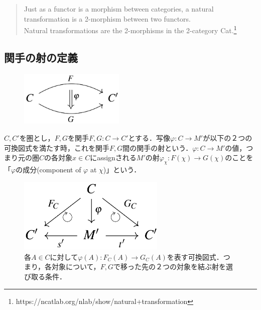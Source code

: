\documentclass[uplatex, 12pt, a4paper, dvipdfmx]{jsarticle}
\begin{document}
\begin{quote}Just as a functor is a morphism between categories, a natural transformation is a 2-morphism between two functors. \\ Natural transformations are the 2-morphisms in the 2-category Cat.\footnote{https://ncatlab.org/nlab/show/natural+transformation}\end{quote}
\subsection{関手の射の定義}
\begin{figure}[ht]\begin{center}\includegraphics[width=5cm]{cd-12.png}\end{center}\end{figure}
\begin{shadebox}\begin{definition}[関手の射]
    $C,C'$を圏とし，$F,G$を関手$F,G:C\longrightarrow C'$とする．写像$\varphi : C\longrightarrow M'$が以下の２つの可換図式を満たす時，これを関手$F,G$間の関手の射という．$\varphi :C\longrightarrow M'$の値，つまり元の圏$C$の各対象$x\in C$にassignされる$M'$の射$\varphi_{\chi}:F(\chi)\longrightarrow G(\chi)$のことを「$\varphi$の成分(component of $\varphi$ at $\chi$)」という．
\end{definition}\end{shadebox}

\begin{figure}[ht]\begin{center}
    \caption{各$A\in C$に対して$\varphi (A):F_C(A)\longrightarrow G_C(A)$を表す可換図式．つまり，各対象について，$F,G$で移った先の２つの対象を結ぶ射を選び取る条件．\label{def-cd:13}}
    \includegraphics[width=7cm]{cd-13.png}
\end{center}\end{figure}
\end{document}
